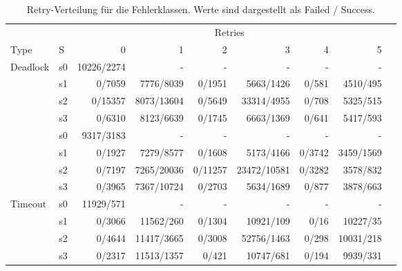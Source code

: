 \begin{table}[htbp]
	\centering
	\caption{Retry-Verteilung für die Fehlerklassen.
	Werte sind dargestellt als Failed / Success.}
	\label{tab:s-retryDistribution}
	\footnotesize
	\setlength{\tabcolsep}{3pt}

	\begin{tabular}{llrrrrrrr}
		\toprule
		& & \multicolumn{6}{c}{Retries} & \\
		Type & S & 0 & 1 & 2 & 3 & 4 & 5 \\
		\midrule

		\multirow{5}{*}{Deadlock}
		& s0
		& 10226/2274 & - & -
		& - & - & - \\

		& s1
		& 0/7059 & 7776/8039 & 0/1951
		& 5663/1426 & 0/581 & 4510/495 \\

		& s2
		& 0/15357 & 8073/13604 & 0/5649
		& 33314/4955 & 0/708 & 5325/515 \\

		& s3
		& 0/6310 & 8123/6639 & 0/1745
		& 6663/1369 & 0/641 & 5417/593 \\

		\midrule

		\multirow{5}{*}{Serialization}
		& s0
		& 9317/3183 & - & -
		& - & - & - \\

		& s1
		& 0/1927 & 7279/8577 & 0/1608
		& 5173/4166 & 0/3742 & 3459/1569 \\

		& s2
		& 0/7197 & 7265/20036 & 0/11257
		& 23472/10581 & 0/3282 & 3578/832 \\

		& s3
		& 0/3965 & 7367/10724 & 0/2703
		& 5634/1689 & 0/877 & 3878/663 \\

		\midrule

		\multirow{5}{*}{Timeout}
		& s0
		& 11929/571 & - & -
		& - & - & - \\

		& s1
		& 0/3066 & 11562/260 & 0/1304
		& 10921/109 & 0/16 & 10227/35 \\

		& s2
		& 0/4644 & 11417/3665 & 0/3008
		& 52756/1463 & 0/298 & 10031/218 \\

		& s3
		& 0/2317 & 11513/1357 & 0/421
		& 10747/681 & 0/194 & 9939/331 \\

		\bottomrule
	\end{tabular}
	\vspace{0.3em}
\end{table}